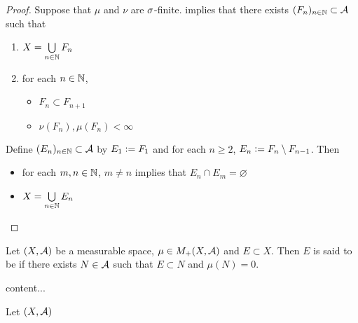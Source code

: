 \documentclass{book}
\begin{document}
	\begin{proof}
		Suppose that $\mu$ and $\nu$ are $\sigma$-finite.  implies that there exists $(F_n)_{n \in \mathbb{N}} \subset \mathcal{A}$ such that 
		\begin{enumerate}
			\item $X = \bigcup\limits_{n \in \mathbb{N}} F_n$
			\item for each $n \in \mathbb{N}$,
			\begin{itemize}
				\item $F_n \subset F_{n+1}$
				\item $\nu(F_n), \mu(F_n) < \infty$
			\end{itemize}
		\end{enumerate} 
		Define $(E_n)_{n \in \mathbb{N}} \subset \mathcal{A}$ by $E_1 \vcentcolon= F_1$ and for each $n \geq 2$, $E_n \vcentcolon= F_n \setminus F_{n-1}$. Then 
		\begin{itemize}
			\item for each $m,n \in \mathbb{N}$, $m \neq n$ implies that $E_n \cap E_m = \varnothing$
			\item $X = \bigcup\limits_{n \in \mathbb{N}} E_n$
		\end{itemize}
	\end{proof}
	
	\begin{defn}
		Let $(X, \mathcal{A})$ be a measurable space, $\mu \in M_+(X, \mathcal{A})$ and $E \subset X$. Then $E$ is said to be  if there exists $N \in \mathcal{A}$ such that $E \subset N$ and $\mu(N) = 0$.
	\end{defn}

	\begin{ex}
		content...
	\end{ex}

	\begin{defn}
		Let $(X, \mathcal{A})$
	\end{defn}
\end{document}

